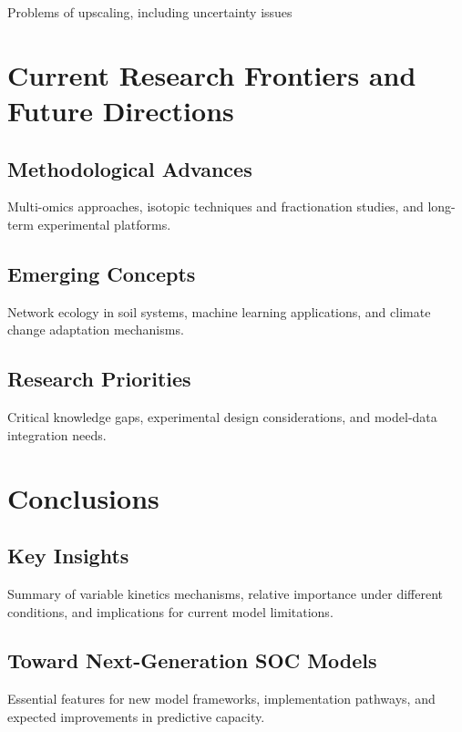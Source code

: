\documentclass[12pt,a4paper]{article}
\begin{document}
Problems of upscaling, including uncertainty issues


\section{Current Research Frontiers and Future Directions} \label{sec:future}

\subsection{Methodological Advances} \label{sec:future_methods}

Multi-omics approaches, isotopic techniques and fractionation studies, and long-term experimental platforms.

\subsection{Emerging Concepts} \label{sec:future_concepts}

Network ecology in soil systems, machine learning applications, and climate change adaptation mechanisms.

\subsection{Research Priorities} \label{sec:future_priorities}

Critical knowledge gaps, experimental design considerations, and model-data integration needs.


\section{Conclusions} \label{sec:conclusions}

\subsection{Key Insights} \label{sec:conclusions_insights}

Summary of variable kinetics mechanisms, relative importance under different conditions, and implications for current model limitations.

\subsection{Toward Next-Generation SOC Models} \label{sec:conclusions_models}

Essential features for new model frameworks, implementation pathways, and expected improvements in predictive capacity.
\end{document}
